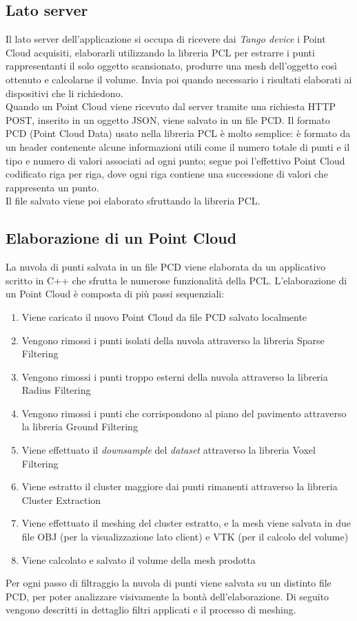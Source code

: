 \subsection{Lato server}
Il lato server dell'applicazione si occupa di ricevere dai \emph{Tango device} i Point Cloud acquisiti, elaborarli utilizzando la libreria PCL per estrarre i punti rappresentanti il solo oggetto scansionato, produrre una mesh dell'oggetto così ottenuto e calcolarne il volume. Invia poi quando necessario i risultati elaborati ai dispositivi che li richiedono.\\
Quando un Point Cloud viene ricevuto dal server tramite una richiesta HTTP POST, inserito in un oggetto JSON, viene salvato in un file PCD. Il formato PCD (Point Cloud Data) usato nella libreria PCL è molto semplice: è formato da un header contenente alcune informazioni utili come il numero totale di punti e il tipo e numero di valori associati ad ogni punto; segue poi l'effettivo Point Cloud codificato riga per riga, dove ogni riga contiene una successione di valori che rappresenta un punto.\\
Il file salvato viene poi elaborato sfruttando la libreria PCL.

\subsection{Elaborazione di un Point Cloud}

La nuvola di punti salvata in un file PCD viene elaborata da un applicativo scritto in C++ che sfrutta le numerose funzionalità della PCL.
L'elaborazione di un Point Cloud è composta di più passi sequenziali:
\begin{enumerate}
\item Viene caricato il nuovo Point Cloud da file PCD salvato localmente
\item Vengono rimossi i punti isolati della nuvola attraverso la libreria Sparse Filtering
\item Vengono rimossi i punti troppo esterni della nuvola attraverso la libreria Radius Filtering 
\item Vengono rimossi i punti che corrispondono al piano del pavimento attraverso la libreria Ground Filtering
\item Viene effettuato il \emph{downsample} del \emph{dataset} attraverso la libreria Voxel Filtering
\item Viene estratto il cluster maggiore dai punti rimanenti attraverso la libreria Cluster Extraction
\item Viene effettuato il meshing del cluster estratto, e la mesh viene salvata in due file OBJ (per la visualizzazione lato client) e VTK (per il calcolo del volume)
\item Viene calcolato e salvato il volume della mesh prodotta
\end{enumerate}
Per ogni passo di filtraggio la nuvola di punti viene salvata su un distinto file PCD, per poter analizzare visivamente la bontà dell'elaborazione.
Di seguito vengono descritti in dettaglio filtri applicati e il processo di meshing.


